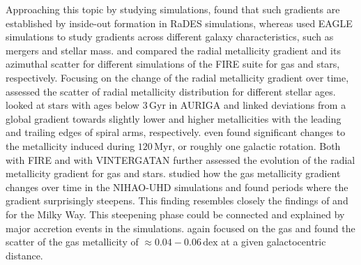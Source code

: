 \documentclass[twocolumn,apj,numberedappendix,appendixfloats]{openjournal}
\begin{document}
\begin{CJK*}{UTF8}{gbsn}
Approaching this topic by studying simulations, \citet{Pilkington2012} found that such gradients are established by inside-out formation in RaDES simulations, whereas \citet{Tissera2019} used EAGLE simulations to study gradients across different galaxy characteristics, such as mergers and stellar mass. \citet{Bellardini2021} and \citet{Bellardini2022, Graf2024} compared the radial metallicity gradient and its azimuthal scatter for different simulations of the FIRE suite for gas and stars, respectively. Focusing on the change of the radial metallicity gradient over time, \citet{Grand2015} assessed the scatter of radial metallicity distribution for different stellar ages. \citet{Grand2016} looked at stars with ages below $3\,\mathrm{Gyr}$ in AURIGA and linked deviations from a global gradient towards slightly lower and higher metallicities with the leading and trailing edges of spiral arms, respectively. \citet{Grand2016} even found significant changes to the metallicity induced during $120\,\mathrm{Myr}$, or roughly one galactic rotation. Both \citet[][see their Fig. 6]{Ma2017} with FIRE and \citet[see their Fig. 9;][]{Agertz2021} with VINTERGATAN further assessed the evolution of the radial metallicity gradient for gas and stars. \citet{Buck2023} studied how the gas metallicity gradient changes over time in the NIHAO-UHD simulations and found periods where the gradient surprisingly steepens. This finding resembles closely the findings of \citet{Lu2022} and \citet{Ratcliffe2023} for the Milky Way. This steepening phase could be connected and explained by major accretion events in the simulations. \citet{Khoperskov2023e} again focused on the gas and found the scatter of the gas metallicity of $\approx 0.04-0.06\,\mathrm{dex}$ at a given galactocentric distance.


\end{CJK*}
\end{document}
